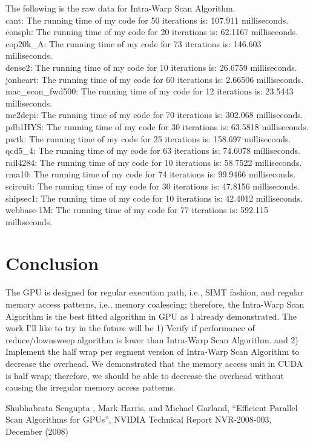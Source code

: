 \documentclass[preprint, prX, amsmath,amssymb]{revtex4-1}
\begin{document}
The following is the raw data for Intra-Warp Scan Algorithm.\\
cant: The running time of my code for 50 iterations is: 107.911 milliseconds. \\
consph: The running time of my code for 20 iterations is: 62.1167 milliseconds.\\ 
cop20k\_A: The running time of my code for 73 iterations is: 146.603 milliseconds.\\
dense2: The running time of my code for 10 iterations is: 26.6759 milliseconds. \\
jonheart: The running time of my code for 60 iterations is: 2.66506 milliseconds. \\
mac\_econ\_fwd500: The running time of my code for 12 iterations is: 23.5443 milliseconds.\\ 
mc2depi: The running time of my code for 70 iterations is: 302.068 milliseconds. \\
pdb1HYS: The running time of my code for 30 iterations is: 63.5818 milliseconds. \\
pwtk: The running time of my code for 25 iterations is: 158.697 milliseconds. \\
qcd5\_4: The running time of my code for 63 iterations is: 74.6078 milliseconds.\\ 
rail4284: The running time of my code for 10 iterations is: 58.7522 milliseconds. \\
rma10: The running time of my code for 74 iterations is: 99.9466 milliseconds. \\
scircuit: The running time of my code for 30 iterations is: 47.8156 milliseconds. \\
shipsec1: The running time of my code for 10 iterations is: 42.4012 milliseconds. \\
webbase-1M: The running time of my code for 77 iterations is: 592.115 milliseconds. 

\section{Conclusion}
The GPU is designed for regular execution path, i.e., SIMT fashion, and regular memory access patterns, i.e., memory coalescing; therefore, the Intra-Warp Scan Algorithm is the best fitted algorithm in GPU as I already demonstrated. The work I'll like to try in the future will be 1) Verify if performance of reduce/downsweep algorithm is lower than Intra-Warp Scan Algorithm. and 2) Implement the half wrap per segment version of Intra-Warp Scan Algorithm to decrease the overhead.  We demonstrated that the memory access unit in CUDA is half wrap; therefore, we should be able to decrease the overhead without causing the irregular memory access patterns. 

\begin{references}
 Shubhabrata Sengupta
, Mark Harris, and Michael Garland, ``Efficient Parallel Scan Algorithms for GPUs'',  NVIDIA Technical Report NVR-2008-003, December (2008)
    \end{references}
\end{document}
